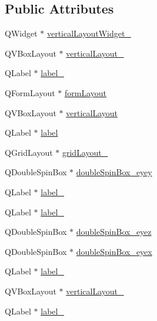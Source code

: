 \subsection*{Public Attributes}
\begin{DoxyCompactItemize}
\item 
Q\+Widget $\ast$ \hyperlink{class_ui___dialog_eyes_a27186a39ae6dc855ac34f50e68590e54}{vertical\+Layout\+Widget\+\_}
\item 
Q\+V\+Box\+Layout $\ast$ \hyperlink{class_ui___dialog_eyes_a894170ae9e75a9d3800072b4ebfa2639}{vertical\+Layout\+\_}
\item 
Q\+Label $\ast$ \hyperlink{class_ui___dialog_eyes_af980b1895bf87b705bf10f401cd75d3f}{label\+\_}
\item 
Q\+Form\+Layout $\ast$ \hyperlink{class_ui___dialog_eyes_a83076edd627b19377863a28f11ff74b2}{form\+Layout}
\item 
Q\+V\+Box\+Layout $\ast$ \hyperlink{class_ui___dialog_eyes_a7268513884026bc8a04b16b04fc41cde}{vertical\+Layout}
\item 
Q\+Label $\ast$ \hyperlink{class_ui___dialog_eyes_a448b37d2a7906fae559cdd59f913c5cb}{label}
\item 
Q\+Grid\+Layout $\ast$ \hyperlink{class_ui___dialog_eyes_a5957bc0bb2476de51bdc5d3670d147f4}{grid\+Layout\+\_}
\item 
Q\+Double\+Spin\+Box $\ast$ \hyperlink{class_ui___dialog_eyes_a0f2e95f66886cb79ba533a3d50501157}{double\+Spin\+Box\+\_\+eyey}
\item 
Q\+Label $\ast$ \hyperlink{class_ui___dialog_eyes_a085f807dc2b0830a9ed847d460887eb5}{label\+\_}
\item 
Q\+Label $\ast$ \hyperlink{class_ui___dialog_eyes_a12773bd4af3d824420d1d6f2a6a1ff8c}{label\+\_}
\item 
Q\+Double\+Spin\+Box $\ast$ \hyperlink{class_ui___dialog_eyes_adc1990f769605d17d2d0dce6b2540130}{double\+Spin\+Box\+\_\+eyez}
\item 
Q\+Double\+Spin\+Box $\ast$ \hyperlink{class_ui___dialog_eyes_aef63991da52508c1b8c4c187cc426626}{double\+Spin\+Box\+\_\+eyex}
\item 
Q\+Label $\ast$ \hyperlink{class_ui___dialog_eyes_a9d88de1f1a79acc44a2e89fafa28e72c}{label\+\_}
\item 
Q\+V\+Box\+Layout $\ast$ \hyperlink{class_ui___dialog_eyes_a72332239b48624787211c642925f9c57}{vertical\+Layout\+\_}
\item 
Q\+Label $\ast$ \hyperlink{class_ui___dialog_eyes_a2baff1eaac5a1f56aa1069ea7338da04}{label\+\_}

\end{DoxyCompactItemize}

